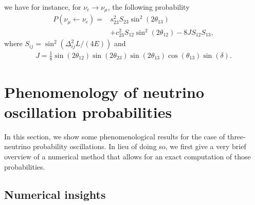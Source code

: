 \documentclass[twocolumn,secnumarabic,amssymb, nobibnotes, aps, prd,10pt]{revtex4-1}
\begin{document}
we have for instance, for $\nu_e \longrightarrow \nu_\mu$, the following probability
\begin{align}
P (\nu_\mu \longleftarrow \nu_e) =& s_{23}^{2} S_{23} \sin^2 (2 \theta_{13})  \nonumber \\
& + c_{23}^{2} S_{12} \sin^2(2 \theta_{12}) - 8 J S_{12} S_{13} ,
\end{align} 
where $S_{ij} = \sin^2 \left( \Delta_{ij}^2 L / (4E) \right)$ and 
\begin{align}
J = \frac{1}{8} \sin \left(2 \theta_{12}\right) \sin \left(2 \theta_{23}\right) \sin \left(2 \theta_{13}\right) \cos \left(\theta_{13}\right) \sin (\delta) . \nonumber
\end{align}


\section{Phenomenology of neutrino oscillation probabilities}
\label{sec:pheno}

In this section, we show some phenomenological results for the case of three-neutrino
probability oscillations. In lieu of doing so, we first give a very brief overview of
a numerical method that allows for an exact computation of those probabilities.


\subsection{Numerical insights}
\label{subsec:numerical}
\end{document}
